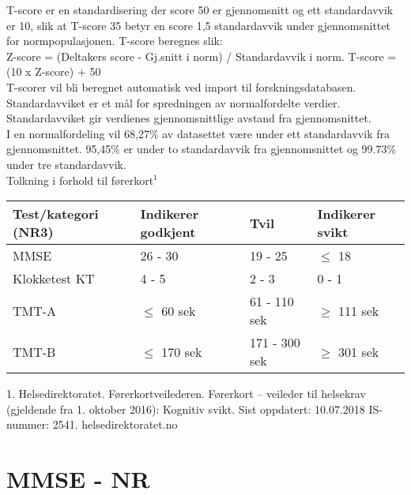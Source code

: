 \documentclass[pdf,  style=code128, globalid=OMRCRFv5.0.2, english, stamp, pagemark, oneside]{sdapsclassic}
\begin{document}
\begin{questionnaire}
   \begin{tcolorbox}
     T-score er en standardisering der score 50 er gjennomsnitt og ett standardavvik er 10, slik at T-score 35 betyr en score 1,5 standardavvik under gjennomsnittet for normpopulasjonen. T-score beregnes slik:\\
     Z-score = (Deltakers score - Gj.snitt i norm) / Standardavvik i norm. T-score = (10 x Z-score) + 50\\
     T-scorer vil bli beregnet automatisk ved import til forskningsdatabasen.\\[0.3em]
     Standardavviket er et mål for spredningen av normalfordelte verdier. Standardavviket gir verdienes gjennomsnittlige avstand fra gjennomsnittet.\\
     I en normalfordeling vil 68,27\% av datasettet være under ett standardavvik fra gjennomsnittet. 95,45\% er under to standardavvik fra gjennomsnittet og 99.73\% under tre standardavvik.\\

     Tolkning i forhold til førerkort$^1$\\[0.2em]
     \begin{tabular}{|l |l |l |l|}
       \hline
       \textbf{Test/kategori} (NR3) & Indikerer godkjent & Tvil & Indikerer svikt\\
       \hline
       MMSE & 26 - 30 & 19 - 25 &  $\leq$ 18 \\
       \hline
       Klokketest KT & 4 - 5 & 2 - 3 & 0 - 1 \\
       \hline
       TMT-A & $\leq$ 60 sek & 61 - 110 sek & $\geq$ 111 sek \\
       \hline
       TMT-B & $\leq$ 170 sek & 171 - 300 sek & $\geq$ 301 sek \\
       \hline
     \end{tabular}

      \vspace{0.4em}
      \footnotesize
      1. Helsedirektoratet. Førerkortveilederen. Førerkort – veileder til helsekrav (gjeldende fra 1. oktober 2016): Kognitiv svikt. Sist oppdatert: 10.07.2018 IS-nummer: 2541. helsedirektoratet.no
      \normalsize
   \end{tcolorbox}

    \section{MMSE - NR}



\end{questionnaire}
\end{document}
